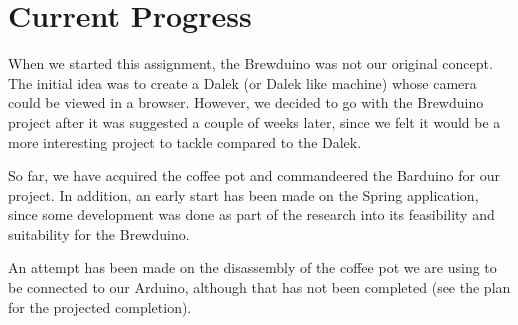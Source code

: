 \documentclass[11pt, a4paper]{article}
\begin{document}

\section{Current Progress}
When we started this assignment, the Brewduino was not our original concept. The
initial idea was to create a Dalek (or Dalek like machine) whose camera could be
viewed in a browser. However, we decided to go with the Brewduino project after
it was suggested a couple of weeks later, since we felt it would be a more
interesting project to tackle compared to the Dalek.

So far, we have acquired the coffee pot and commandeered the Barduino for our
project. In addition, an early start has been made on the Spring application,
since some development was done as part of the research into its feasibility and
suitability for the Brewduino.

An attempt has been made on the disassembly of the coffee pot we are using to be
connected to our Arduino, although that has not been completed (see the plan for
the projected completion).


\newpage


 
\end{document}
